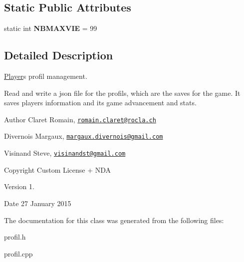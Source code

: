 \subsection*{Static Public Attributes}
\begin{DoxyCompactItemize}
\item 
\hypertarget{class_profil_a0b2e757f8408a36260136e1e2033557e}{}static int {\bfseries N\+B\+M\+A\+X\+V\+I\+E} = 99\label{class_profil_a0b2e757f8408a36260136e1e2033557e}

\end{DoxyCompactItemize}


\subsection{Detailed Description}
\hyperlink{class_player}{Player}\textquotesingle{}s profil management. 

Read and write a json file for the profils, which are the saves for the game. It saves player\textquotesingle{}s information and its game advancement and stats. \begin{DoxyAuthor}{Author}
Claret Romain, \href{mailto:romain.claret@rocla.ch}{\tt romain.\+claret@rocla.\+ch} 

Divernois Margaux, \href{mailto:margaux.divernois@gmail.com}{\tt margaux.\+divernois@gmail.\+com} 

Visinand Steve, \href{mailto:visinandst@gmail.com}{\tt visinandst@gmail.\+com} 
\end{DoxyAuthor}
\begin{DoxyCopyright}{Copyright}
Custom License + N\+D\+A 
\end{DoxyCopyright}
\begin{DoxyVersion}{Version}
1. 
\end{DoxyVersion}
\begin{DoxyDate}{Date}
27 January 2015 
\end{DoxyDate}


The documentation for this class was generated from the following files\+:\begin{DoxyCompactItemize}
\item 
profil.\+h\item 
profil.\+cpp\end{DoxyCompactItemize}
